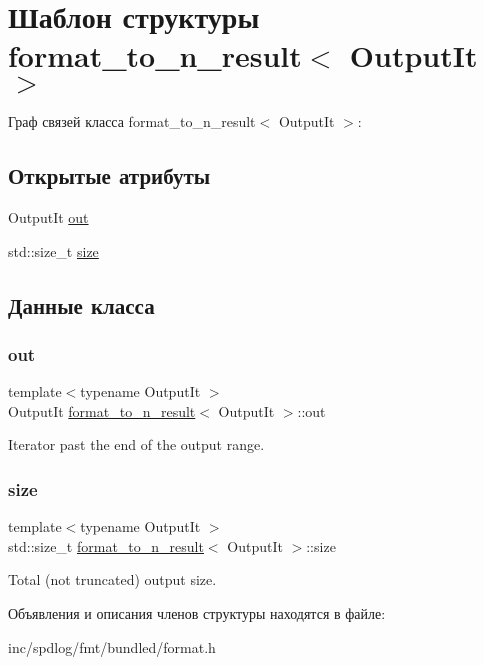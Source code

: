 \hypertarget{structformat__to__n__result}{}\section{Шаблон структуры format\+\_\+to\+\_\+n\+\_\+result$<$ Output\+It $>$}
\label{structformat__to__n__result}


Граф связей класса format\+\_\+to\+\_\+n\+\_\+result$<$ Output\+It $>$\+:
\subsection*{Открытые атрибуты}
\begin{DoxyCompactItemize}
\item 
Output\+It \hyperlink{structformat__to__n__result_a90597c6c1d23c7301aef16e756c6263b}{out}
\item 
std\+::size\+\_\+t \hyperlink{structformat__to__n__result_a5d0924cddcfab39a1c38ff0e75cbe5bf}{size}
\end{DoxyCompactItemize}


\subsection{Данные класса}
\mbox{\label{structformat__to__n__result_a90597c6c1d23c7301aef16e756c6263b}} 
\subsubsection{\texorpdfstring{out}{out}}
{\footnotesize\ttfamily template$<$typename Output\+It $>$ \\
Output\+It \hyperlink{structformat__to__n__result}{format\+\_\+to\+\_\+n\+\_\+result}$<$ Output\+It $>$\+::out}

Iterator past the end of the output range. \mbox{\label{structformat__to__n__result_a5d0924cddcfab39a1c38ff0e75cbe5bf}} 
\subsubsection{\texorpdfstring{size}{size}}
{\footnotesize\ttfamily template$<$typename Output\+It $>$ \\
std\+::size\+\_\+t \hyperlink{structformat__to__n__result}{format\+\_\+to\+\_\+n\+\_\+result}$<$ Output\+It $>$\+::size}

Total (not truncated) output size. 

Объявления и описания членов структуры находятся в файле\+:\begin{DoxyCompactItemize}
\item 
inc/spdlog/fmt/bundled/format.\+h\end{DoxyCompactItemize}
